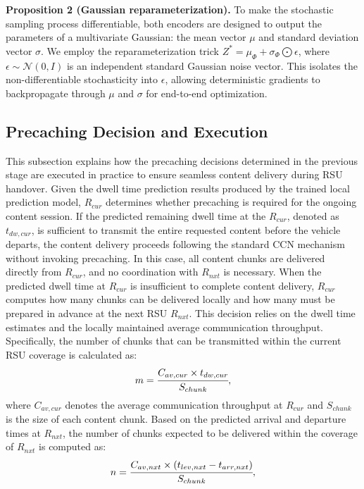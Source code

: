 \documentclass[journal]{IEEEtran}
\begin{document}
\textbf{Proposition 2 (Gaussian reparameterization).}
To make the stochastic sampling process differentiable, both encoders are designed to output the parameters of a multivariate Gaussian: the mean vector $\mu$ and standard deviation vector $\sigma$.
We employ the reparameterization trick $Z^{*}=\mu_{\Phi}+\sigma_{\Phi}\bigodot\epsilon$, where $\epsilon\sim\mathcal{N}(0,I)$ is an independent standard Gaussian noise vector.
This isolates the non-differentiable stochasticity into $\epsilon$, allowing deterministic gradients to backpropagate through $\mu$ and $\sigma$ for end-to-end optimization.


\subsection{Precaching Decision and Execution} \label{subsec:3}
This subsection explains how the precaching decisions determined in the previous stage are executed in practice to ensure seamless content delivery during RSU handover.
Given the dwell time prediction results produced by the trained local prediction model, $R_{cur}$ determines whether precaching is required for the ongoing content session.
If the predicted remaining dwell time at the $R_{cur}$, denoted as $t_{dw,cur}$, is sufficient to transmit the entire requested content before the vehicle departs, the content delivery proceeds following the standard CCN mechanism without invoking precaching.
In this case, all content chunks are delivered directly from $R_{cur}$, and no coordination with $R_{nxt}$ is necessary.
%
When the predicted dwell time at $R_{cur}$ is insufficient to complete content delivery, 
$R_{cur}$ computes how many chunks can be delivered locally and how many must be prepared in advance at the next RSU $R_{nxt}$.
This decision relies on the dwell time estimates and the locally maintained average communication throughput.
Specifically, the number of chunks that can be transmitted within the current RSU coverage is calculated as:
\begin{equation}
    m = \cfrac{C_{av, cur} \times t_{dw, cur}}{S_{chunk}}, \label{eq:m}
\end{equation}
where $C_{av, cur}$ denotes the average communication throughput at $R_{cur}$ and $S_{chunk}$ is the size of each content chunk.
Based on the predicted arrival and departure times at $R_{nxt}$, the number of chunks expected to be delivered within the coverage of $R_{nxt}$ is computed as:
\begin{equation}
    n = \cfrac{C_{av, nxt} \times \left( t_{lev, nxt} - t_{arr, nxt} \right)}{S_{chunk}}, \label{eq:n}
\end{equation}
\end{document}
